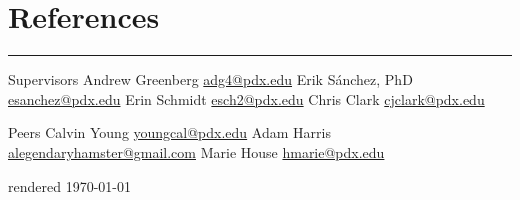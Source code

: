\section{References}
\noindent\rule{\textwidth}{\hlinewidth}
	\begin{innerlist}
	\item Supervisors
		\subitem Andrew Greenberg \hfill\href{mailto:adg4@pdx.edu}{adg4@pdx.edu}
		\subitem Erik S\'anchez, PhD \hfill\href{mailto:esanchez@pdx.edu}{esanchez@pdx.edu}
		\subitem Erin Schmidt \hfill\href{mailto:esch2@pdx.edu}{esch2@pdx.edu}
		\subitem Chris Clark \hfill\href{mailto:cjclark@pdx.edu}{cjclark@pdx.edu}
	\item Peers
		\subitem Calvin Young \hfill\href{mailto:youngcal@pdx.edu}{youngcal@pdx.edu}
		\subitem Adam Harris \hfill\href{mailto:alegendaryhamster@gmail.com}{alegendaryhamster@gmail.com}
		\subitem Marie House \hfill\href{mailto:hmarie@pdx.edu}{hmarie@pdx.edu}
	\end{innerlist}

\vfill
\centering rendered \today

